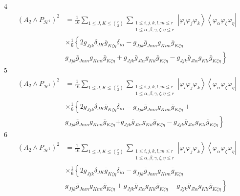 \documentclass[aps,preprint]{revtex4}%
\begin{document}
4%
\begin{align}
\left(  A_{2}\wedge P_{\mathcal{H}^{1}}\right)  ^{2} &  =\frac{1}{16}%
\sum_{1\leq J,K\leq\binom{r}{2}}\sum_{\substack{1\leq i,j,k,l,m\leq
r\\1\leq\alpha,\beta,\gamma,\zeta,\eta\leq r}}\left\vert \varphi_{i}%
\varphi_{j}\varphi_{k}\right\rangle \left\langle \varphi_{\alpha}%
\varphi_{\zeta}\varphi_{\eta}\right\vert \\
&  \times\frac{1}{6}\left\{  2g_{Jjk}\delta_{JK}\bar{g}_{K\zeta\eta}%
\delta_{i\alpha}-g_{Jjk}\bar{g}_{J\alpha m}g_{Kim}\bar{g}_{K\zeta\eta}\right.
\\
&  \left.  g_{Jjk}\bar{g}_{J\alpha m}g_{Kmi}\bar{g}_{K\zeta\eta}+g_{Jjk}%
\bar{g}_{Jl\alpha}g_{Kil}\bar{g}_{K\zeta\eta}-g_{Jjk}\bar{g}_{Jl\alpha}%
g_{Kli}\bar{g}_{K\zeta\eta}\right\}
\end{align}
5%
\begin{align}
\left(  A_{2}\wedge P_{\mathcal{H}^{1}}\right)  ^{2} &  =\frac{1}{16}%
\sum_{1\leq J,K\leq\binom{r}{2}}\sum_{\substack{1\leq i,j,k,l,m\leq
r\\1\leq\alpha,\beta,\gamma,\zeta,\eta\leq r}}\left\vert \varphi_{i}%
\varphi_{j}\varphi_{k}\right\rangle \left\langle \varphi_{\alpha}%
\varphi_{\zeta}\varphi_{\eta}\right\vert \\
&  \times\frac{1}{6}\left\{  2g_{Jjk}\delta_{JK}\bar{g}_{K\zeta\eta}%
\delta_{i\alpha}-g_{Jjk}\bar{g}_{J\alpha m}g_{Kim}\bar{g}_{K\zeta\eta
}+\right.  \\
&  g_{Jjk}\bar{g}_{J\alpha m}g_{Kmi}\bar{g}_{K\zeta\eta}\left.  +g_{Jjk}%
\bar{g}_{Jl\alpha}g_{Kil}\bar{g}_{K\zeta\eta}-g_{Jjk}\bar{g}_{Jl\alpha}%
g_{Kli}\bar{g}_{K\zeta\eta}\right\}
\end{align}
6%
\begin{align}
\left(  A_{2}\wedge P_{\mathcal{H}^{1}}\right)  ^{2} &  =\frac{1}{16}%
\sum_{1\leq J,K\leq\binom{r}{2}}\sum_{\substack{1\leq i,j,k,l,m\leq
r\\1\leq\alpha,\beta,\gamma,\zeta,\eta\leq r}}\left\vert \varphi_{i}%
\varphi_{j}\varphi_{k}\right\rangle \left\langle \varphi_{\alpha}%
\varphi_{\zeta}\varphi_{\eta}\right\vert \\
&  \times\frac{1}{6}\left\{  2g_{Jjk}\delta_{JK}\bar{g}_{K\zeta\eta}%
\delta_{i\alpha}-g_{Jjk}\bar{g}_{J\alpha m}g_{Kim}\bar{g}_{K\zeta\eta}\right.
\\
&  \left.  g_{Jjk}\bar{g}_{J\alpha m}g_{Kmi}\bar{g}_{K\zeta\eta}+g_{Jjk}%
\bar{g}_{Jl\alpha}g_{Kil}\bar{g}_{K\zeta\eta}-g_{Jjk}\bar{g}_{Jl\alpha}%
g_{Kli}\bar{g}_{K\zeta\eta}\right\}
\end{align}
\end{document}
